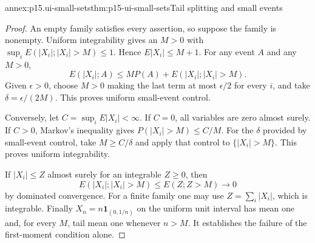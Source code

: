 
\begin{annexitem}{annex:p15.ui-small-sets}{thm:p15-ui-small-sets}{Tail splitting and small events}
\begin{proof}
An empty family satisfies every assertion, so suppose the family is nonempty.
Uniform integrability gives an \(M>0\) with
\(\sup_iE(|X_i|;|X_i|>M)\leq1\). Hence \(E|X_i|\leq M+1\).
For any event \(A\) and any \(M>0\),
\[
             E(|X_i|;A)\leq MP(A)+E(|X_i|;|X_i|>M).
\]
Given \(\epsilon>0\), choose \(M>0\) making the last term at most
\(\epsilon/2\) for every \(i\), and take
\(\delta=\epsilon/(2M)\). This proves uniform small-event control.

Conversely, let \(C=\sup_iE|X_i|<\infty\). If \(C=0\), all variables
are zero almost surely. If \(C>0\), Markov's inequality gives
\(P(|X_i|>M)\leq C/M\). For the \(\delta\) provided by small-event
control, take \(M\geq C/\delta\) and apply that control to
\(\{|X_i|>M\}\). This proves uniform integrability.

If \(|X_i|\leq Z\) almost surely for an integrable \(Z\geq0\), then
\[
      E(|X_i|;|X_i|>M)\leq E(Z;Z>M)\longrightarrow0
\]
by dominated convergence. For a finite family one may use
\(Z=\sum_i|X_i|\), which is integrable. Finally
\(X_n=n\mathbf1_{(0,1/n)}\) on the uniform unit interval has mean one
and, for every \(M\), tail mean one whenever \(n>M\). It establishes
the failure of the first-moment condition alone.
\end{proof}
\end{annexitem}

